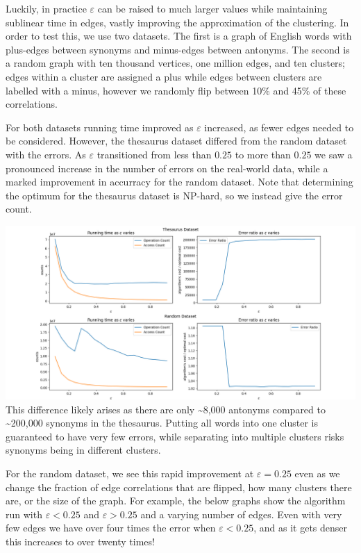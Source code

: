 \documentclass[
]{article}
\begin{document}
Luckily, in practice {\(\varepsilon\)} can be raised to much larger
values while maintaining sublinear time in edges, vastly improving the
approximation of the clustering. In order to test this, we use two
datasets. The first is a graph of English words with plus-edges between
synonyms and minus-edges between antonyms. The second is a random graph
with ten thousand vertices, one million edges, and ten clusters; edges
within a cluster are assigned a plus while edges between clusters are
labelled with a minus, however we randomly flip between 10\% and 45\% of
these correlations.

For both datasets running time improved as {\(\varepsilon\)} increased,
as fewer edges needed to be considered. However, the thesaurus dataset
differed from the random dataset with the errors. As {\(\varepsilon\)}
transitioned from less than {\(0.25\)} to more than {\(0.25\)} we saw a
pronounced increase in the number of errors on the real-world data,
while a marked improvement in accurracy for the random dataset. Note
that determining the optimum for the thesaurus dataset is NP-hard, so we
instead give the error count.

\includegraphics{images/opposite_trends.png}\\
This difference likely arises as there are only \textasciitilde8,000
antonyms compared to \textasciitilde200,000 synonyms in the thesaurus.
Putting all words into one cluster is guaranteed to have very few
errors, while separating into multiple clusters risks synonyms being in
different clusters.

For the random dataset, we see this rapid improvement at
{\(\varepsilon = 0.25\)} even as we change the fraction of edge
correlations that are flipped, how many clusters there are, or the size
of the graph. For example, the below graphs show the algorithm run with
{\(\varepsilon < 0.25\)} and {\(\varepsilon > 0.25\)} and a varying
number of edges. Even with very few edges we have over four times the
error when {\(\varepsilon < 0.25\)}, and as it gets denser this
increases to over twenty times!
\end{document}
